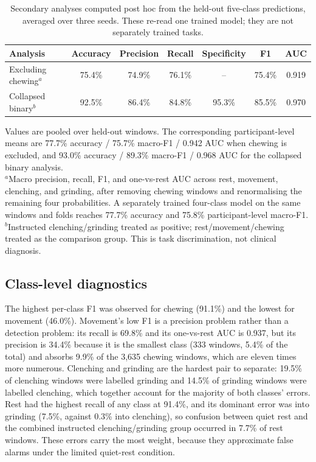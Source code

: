 \documentclass[pdflatex,sn-nature,iicol]{sn-jnl}
\begin{document}
\begin{table}[h]
  \caption{Secondary analyses computed post hoc from the held-out five-class predictions, averaged over three seeds. These re-read one trained model; they are not separately trained tasks.}
  \label{tab:sensitivity}
  \centering
  \begin{tabular}{lcccccc}
    \toprule
    Analysis & Accuracy & Precision & Recall & Specificity & F1 & AUC \\
    \midrule
    Excluding chewing$^{a}$ & 75.4\% & 74.9\% & 76.1\% & -- & 75.4\% & 0.919 \\
    Collapsed binary$^{b}$ & 92.5\% & 86.4\% & 84.8\% & 95.3\% & 85.5\% & 0.970 \\
    \bottomrule
  \end{tabular}
  \begin{flushleft}\footnotesize
  Values are pooled over held-out windows. The corresponding participant-level means are 77.7\% accuracy / 75.7\% macro-F1 / 0.942 AUC when chewing is excluded, and 93.0\% accuracy / 89.3\% macro-F1 / 0.968 AUC for the collapsed binary analysis.\\
  $^{a}$Macro precision, recall, F1, and one-vs-rest AUC across rest, movement, clenching, and grinding, after removing chewing windows and renormalising the remaining four probabilities. A separately trained four-class model on the same windows and folds reaches 77.7\% accuracy and 75.8\% participant-level macro-F1.\\
  $^{b}$Instructed clenching/grinding treated as positive; rest/movement/chewing treated as the comparison group. This is task discrimination, not clinical diagnosis.
  \end{flushleft}
\end{table}

\subsection{Class-level diagnostics}

The highest per-class F1 was observed for chewing (91.1\%) and the lowest for movement (46.0\%). Movement's low F1 is a precision problem rather than a detection problem: its recall is 69.8\% and its one-vs-rest AUC is 0.937, but its precision is 34.4\% because it is the smallest class (333 windows, 5.4\% of the total) and absorbs 9.9\% of the 3,635 chewing windows, which are eleven times more numerous. Clenching and grinding are the hardest pair to separate: 19.5\% of clenching windows were labelled grinding and 14.5\% of grinding windows were labelled clenching, which together account for the majority of both classes' errors. Rest had the highest recall of any class at 91.4\%, and its dominant error was into grinding (7.5\%, against 0.3\% into clenching), so confusion between quiet rest and the combined instructed clenching/grinding group occurred in 7.7\% of rest windows. These errors carry the most weight, because they approximate false alarms under the limited quiet-rest condition.
\end{document}
